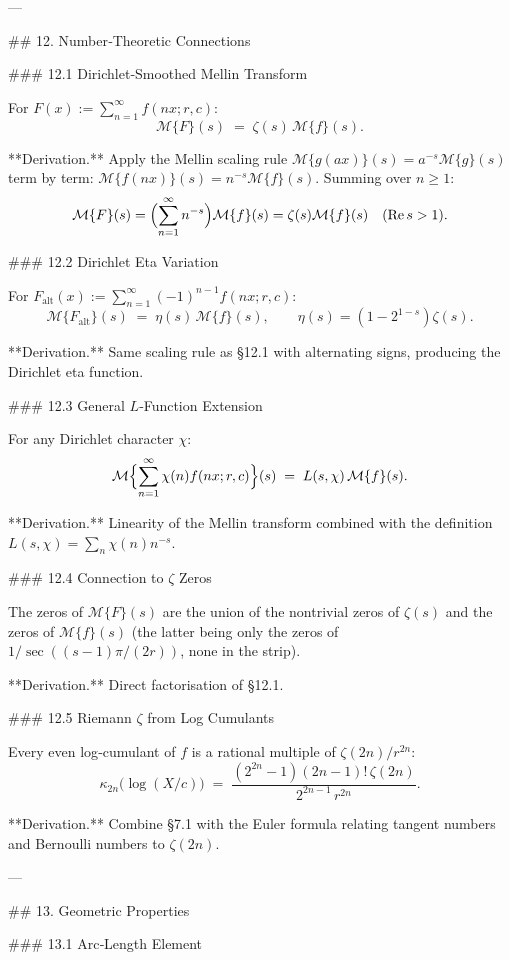 ---

## 12. Number‑Theoretic Connections

### 12.1 Dirichlet‑Smoothed Mellin Transform

For $F(x) := \sum_{n=1}^{\infty}f(nx;r,c)$:
$$
\mathcal M\{F\}(s) \;=\; \zeta(s)\,\mathcal M\{f\}(s).
$$

**Derivation.** Apply the Mellin scaling rule $\mathcal M\{g(ax)\}(s) = a^{-s}\mathcal M\{g\}(s)$ term by term: $\mathcal M\{f(nx)\}(s) = n^{-s}\mathcal M\{f\}(s)$. Summing over $n\ge 1$:
$$
\mathcal M\{F\}(s) = \Bigl(\sum_{n=1}^{\infty}n^{-s}\Bigr)\mathcal M\{f\}(s) = \zeta(s)\mathcal M\{f\}(s)\quad(\operatorname{Re} s>1).
$$

### 12.2 Dirichlet Eta Variation

For $F_{\text{alt}}(x) := \sum_{n=1}^{\infty}(-1)^{n-1}f(nx;r,c)$:
$$
\mathcal M\{F_{\text{alt}}\}(s) \;=\; \eta(s)\,\mathcal M\{f\}(s),\qquad \eta(s) = (1-2^{1-s})\zeta(s).
$$

**Derivation.** Same scaling rule as §12.1 with alternating signs, producing the Dirichlet eta function.

### 12.3 General $L$‑Function Extension

For any Dirichlet character $\chi$:
$$
\mathcal M\Bigl\{\sum_{n=1}^{\infty}\chi(n)f(nx;r,c)\Bigr\}(s) \;=\; L(s,\chi)\,\mathcal M\{f\}(s).
$$

**Derivation.** Linearity of the Mellin transform combined with the definition $L(s,\chi) = \sum_{n}\chi(n)n^{-s}$.

### 12.4 Connection to $\zeta$ Zeros

The zeros of $\mathcal M\{F\}(s)$ are the union of the nontrivial zeros of $\zeta(s)$ and the zeros of $\mathcal M\{f\}(s)$ (the latter being only the zeros of $1/\sec((s-1)\pi/(2r))$, none in the strip).

**Derivation.** Direct factorisation of §12.1.

### 12.5 Riemann $\zeta$ from Log Cumulants

Every even log‑cumulant of $f$ is a rational multiple of $\zeta(2n)/r^{2n}$:
$$
\kappa_{2n}\!\bigl(\log(X/c)\bigr) \;=\; \frac{(2^{2n}-1)(2n-1)!\,\zeta(2n)}{2^{2n-1}\,r^{2n}}.
$$

**Derivation.** Combine §7.1 with the Euler formula relating tangent numbers and Bernoulli numbers to $\zeta(2n)$.

---

## 13. Geometric Properties

### 13.1 Arc‑Length Element

